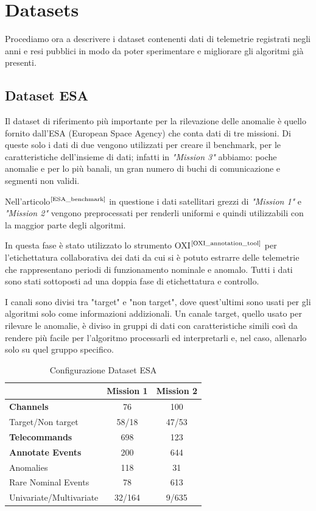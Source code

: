 \chapter{Datasets}
Procediamo ora a descrivere i dataset contenenti dati di telemetrie registrati negli anni e resi pubblici in modo da poter sperimentare e migliorare gli algoritmi già presenti.

\section{Dataset ESA}

Il dataset di riferimento più importante per la rilevazione delle anomalie è quello fornito dall'ESA (European Space Agency) che conta dati di tre missioni. Di queste solo i dati di due vengono utilizzati per creare il benchmark, per le caratteristiche dell'insieme di dati; infatti in \textit{"Mission 3"} abbiamo: poche anomalie e per lo più banali, un gran numero di buchi di comunicazione e segmenti non validi.

Nell'articolo$^{\text{\cite{ESA_benchmark}}}$ in questione i dati satellitari grezzi di \textit{"Mission 1"} e \textit{"Mission 2"} vengono preprocessati per renderli uniformi e quindi utilizzabili con la maggior parte degli algoritmi.

In questa fase è stato utilizzato lo strumento OXI$^{\text{\cite{OXI_annotation_tool}}}$ per l'etichettatura collaborativa dei dati da cui si è potuto estrarre delle telemetrie che rappresentano periodi di funzionamento nominale e anomalo. Tutti i dati sono stati sottoposti ad una doppia fase di etichettatura e controllo.

I canali sono divisi tra "target" e "non target", dove quest'ultimi sono usati per gli algoritmi solo come informazioni addizionali. Un canale target, quello usato per rilevare le anomalie, è diviso in gruppi di dati con caratteristiche simili così da rendere più facile per l'algoritmo processarli ed interpretarli e, nel caso, allenarlo solo su quel gruppo specifico.
\pagebreak

\begin{table}[h!]
    \centering
    \begin{tabular}{|l|c|c|}
        \hline
         \textbf{}& \textbf{Mission 1} & \textbf{Mission 2}\\
         \hline
        \textbf{Channels} & 76 & 100\\
        Target/Non target & 58/18 & 47/53\\
        \hline
        \textbf{Telecommands} & 698 & 123\\
        \hline
        \textbf{Annotate Events} & 200 & 644 \\
        Anomalies& 118 & 31\\
        Rare Nominal Events &78  & 613\\
        Univariate/Multivariate& 32/164 & 9/635\\
        \hline
    \end{tabular}
    \caption{Configurazione Dataset ESA}
    \label{tab:costituzioneESA_dataset}
\end{table}

